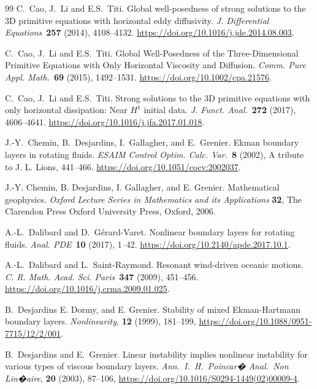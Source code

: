 \documentclass[preprint]{elsarticle}
\numberwithin{equation}{section}
\begin{document}
\begin{thebibliography}{99}
	C.~Cao, J.~Li and E.S.~Titi. 
	Global well-posedness of strong solutions to the 3D primitive equations with horizontal eddy diffusivity.
	\textit{J. Differential Equations}~\textbf{257} (2014), 4108--4132. 
	\url{https://doi.org/10.1016/j.jde.2014.08.003}.
	
	C.~Cao, J.~Li and E.S.~Titi. 
	Global Well-Posedness of the Three-Dimensional Primitive Equations with Only Horizontal Viscosity and Diffusion.
	\textit{Comm. Pure Appl. Math.}~\textbf{69} (2015), 1492--1531. 
	\url{https://doi.org/10.1002/cpa.21576}.
	
	C.~Cao, J.~Li and E.S.~Titi. 
	Strong solutions to the 3D primitive equations with only horizontal dissipation: Near $H^1$ initial data.
	\textit{J. Funct. Anal.}~\textbf{272} (2017), 4606--4641. 
	\url{https://doi.org/10.1016/j.jfa.2017.01.018}.
	
	J.-Y.~Chemin, B.~Desjardins, I.~Gallagher, and E.~Grenier. 
	Ekman boundary layers in rotating fluids.
	\textit{ESAIM Control Optim. Calc. Var.}~\textbf{8} (2002), A tribute to J. L. Lions, 441--466. 
	\url{https://doi.org/10.1051/cocv:2002037}. 
	
	J.-Y. Chemin, B. Desjardins, I. Gallagher, and E. Grenier.
	Mathematical geophysics. \textit{ Oxford
		Lecture Series in Mathematics and its Applications} \textbf{32}, The Clarendon Press Oxford
	University Press, Oxford, 2006.
	
	A.-L.~Dalibard and D.~G\'erard-Varet. 
	Nonlinear boundary layers for rotating fluids.
	\textit{Anal. PDE}~\textbf{10} (2017), 1--42.
	\url{https://doi.org/10.2140/apde.2017.10.1}.
	
	A.-L.~Dalibard and L.~Saint-Raymond. 
	Resonant wind-driven oceanic motions.
	\textit{C. R. Math. Acad. Sci. Paris}~\textbf{347} (2009), 451--456.
	\url{https://doi.org/10.1016/j.crma.2009.01.025}.
	
	B.~Desjardins E. Dormy, and E. Grenier.
	Stability of mixed Ekman-Hartmann boundary layers.
	{\em Nonlinearity}, \textbf{12} (1999), 181--199,
	\url{https://doi.org/10.1088/0951-7715/12/2/001}.
	
	B.~Desjardins and E.~Grenier.
	Linear instability implies nonlinear instability for various types of viscous boundary layers.
	{\em Ann.~I.~H.~Poincar� Anal.~Non Lin�aire}, \textbf{20} (2003), 87--106,
	\url{https://doi.org/10.1016/S0294-1449(02)00009-4}.
	

\end{thebibliography}
\end{document}
